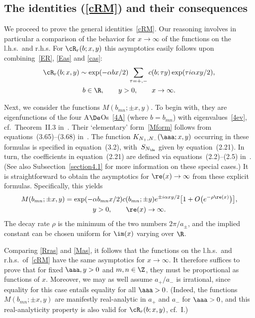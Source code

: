\subsection{The identities (\ref{cRM}) and their consequences}\label{section2.3}

We proceed to prove the general identities~\eqref{cRM}.
Our reasoning involves in particular a comparison of the behavior for $x\to\infty$ of the functions on the l.h.s.\ and r.h.s. For $\cR_r(b;x,y)$ this asymptotics easily follows upon combining~\eqref{ER}, \eqref{Eas} and \eqref{cas}:
\begin{gather}\label{Rras}
\cR_r(b;x,y)\sim \exp(-\alpha bx/2)\sum_{\tau=+,-}c(b;\tau y)\exp(\tau i\alpha xy/2),\\
 b\in\R,\qquad y>0,\qquad x\to\infty.\nonumber
\end{gather}

{\sloppy Next, we consider the functions $M(b_{mn};\pm x,y)$. To begin with, they are eigenfunctions of the four A$\De$Os~\eqref{4A} (where $b=b_{mn}$) with eigenvalues~\eqref{4ev}, cf.~Theorem~II.3 in~\cite{GLFII}. Their `ele\-men\-ta\-ry' form~\eqref{Mform} follows from equations~(3.65)--(3.68) in~\cite{GLFII}. The function $K_{N_{+},N_{-}}(\aaa;x,y)$ occurring in these formulas is specif\/ied in equation~(3.2), with~$S_{N_{\de}}$ given by equation~(2.21). In turn, the coef\/f\/icients in equation~(2.21) are def\/ined via equations~(2.2)--(2.5) in~\cite{GLFII}. (See also Subsection~\ref{section4.1} for more information on these special cases.) It is straightforward to obtain the asymptotics for $\re(x)\to \infty$ from these explicit formulas. Specif\/ically, this yields
\begin{gather}\label{Mas}
M(b_{mn};\pm x,y)=\exp (- \alpha b_{mn}x/2)c(b_{mn};\pm y)e^{ \pm i\alpha xy/2}\big[1+O\big(e^{-\rho \re(x)}\big)\big],\\
 y>0,\qquad \re(x)\to \infty.\nonumber
\end{gather}
The decay rate $\rho$ is the minimum of the two numbers $2\pi /a_{\pm}$, and the implied constant can be chosen uniform for $\im (x)$ varying over $\R$.

}

Comparing \eqref{Rras} and \eqref{Mas}, it follows that the functions on the l.h.s.\ and r.h.s.\ of~\eqref{cRM} have the same asymptotics for $x\to \infty$. It therefore suf\/f\/ices to prove that for f\/ixed $\aaa,y>0$ and $m,n\in\Z$, they must be proportional as functions of $x$. Moreover, we may as well assume $a_{+}/a_{-}$ is irrational, since equality for this case entails equality for all $\aaa>0$. (Indeed, the functions $M(b_{mn};\pm x,y)$ are manifestly real-analytic in $a_{+}$ and $a_{-}$ for $\aaa >0$, and this real-analyticity property is also valid for $\cR_r(b;x,y)$, cf.~I.)

